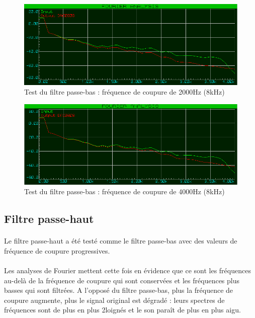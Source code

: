 \documentclass{article}
\begin{document}
    \begin{figure}[H]
        \centering
        \includegraphics[width=.75\textwidth]{./images/spectrum_low_pass_2000_8k.png}
        \caption{Test du filtre passe-bas : fréquence de coupure de 2000Hz (8kHz)}
    \end{figure}
    \begin{figure}[H]
        \centering
        \includegraphics[width=.75\textwidth]{./images/spectrum_low_pass_4000_8k.png}
        \caption{Test du filtre passe-bas : fréquence de coupure de 4000Hz (8kHz)}
    \end{figure}


    \subsection{Filtre passe-haut}
    \paragraph{}
    Le filtre passe-haut a été testé comme le filtre passe-bas avec des valeurs de fréquence de coupure progressives.

    \paragraph{}
    Les analyses de Fourier mettent cette fois en évidence que ce sont les fréquences au-delà de la fréquence de coupure qui sont conservées et les fréquences plus basses qui sont filtrées. A l'opposé du filtre passe-bas, plus la fréquence de coupure augmente, plus le signal original est dégradé : leurs spectres de fréquences sont de plus en plus 2loignés et le son paraît de plus en plus aigu.
\end{document}
